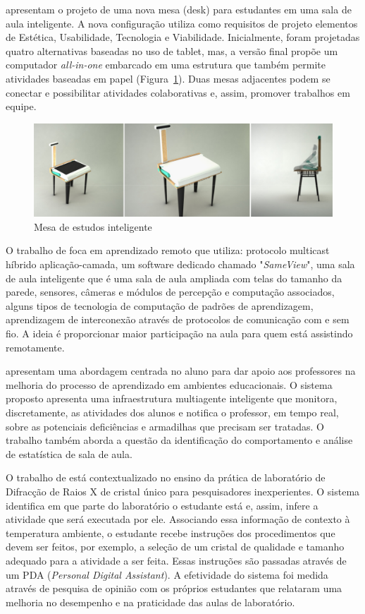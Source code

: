 \cite{Savvaki:2013} apresentam o projeto de uma nova mesa (desk) para estudantes em uma sala de aula inteligente. A nova configuração utiliza como requisitos de projeto elementos de Estética, Usabilidade, Tecnologia e Viabilidade. Inicialmente, foram projetadas quatro alternativas baseadas no uso de tablet, mas, a versão final propõe um computador \textit{all-in-one} embarcado em uma estrutura que também permite atividades baseadas em papel (Figura~\ref{fig:Savvaki2013}). Duas mesas adjacentes podem se conectar e possibilitar atividades colaborativas e, assim, promover trabalhos em equipe.

\begin{figure}[ht]
\centering
\includegraphics[width=0.9\linewidth]{imgs/Savvaki2013}
\caption{Mesa de estudos inteligente}
\label{fig:Savvaki2013}
\end{figure}

O trabalho de \cite{Zhang:2003} foca em aprendizado remoto que utiliza: protocolo multicast híbrido aplicação-camada, um software dedicado chamado "\textit{SameView}", uma sala de aula inteligente que é uma sala de aula ampliada com telas do tamanho da parede, sensores, câmeras e módulos de percepção e computação associados, alguns tipos de tecnologia de computação de padrões de aprendizagem, aprendizagem de interconexão através de protocolos de comunicação com e sem fio. A ideia é proporcionar maior participação na aula para quem está assistindo remotamente.

\cite{Mathioudakis:2013} apresentam uma abordagem centrada no aluno para dar apoio aos professores na melhoria do processo de aprendizado em ambientes educacionais. O sistema proposto apresenta uma infraestrutura multiagente inteligente que monitora, discretamente, as atividades dos alunos e notifica o professor, em tempo real, sobre as potenciais deficiências e armadilhas que precisam ser tratadas. O trabalho também aborda a questão da identificação do comportamento e análise de estatística de sala de aula.

O trabalho de \cite{Hwang:2009} está contextualizado no ensino da prática de laboratório de Difracção de Raios X de cristal único para pesquisadores inexperientes. O sistema identifica em que parte do laboratório o estudante está e, assim, infere a atividade que será executada por ele. Associando essa informação de contexto à temperatura ambiente, o estudante recebe instruções dos procedimentos que devem ser feitos, por exemplo, a seleção de um cristal de qualidade e tamanho adequado para a atividade a ser feita. Essas instruções são passadas através de um PDA (\textit{Personal Digital Assistant}). A efetividade do sistema foi medida através de pesquisa de opinião com os próprios estudantes que relataram uma melhoria no desempenho e na praticidade das aulas de laboratório.

